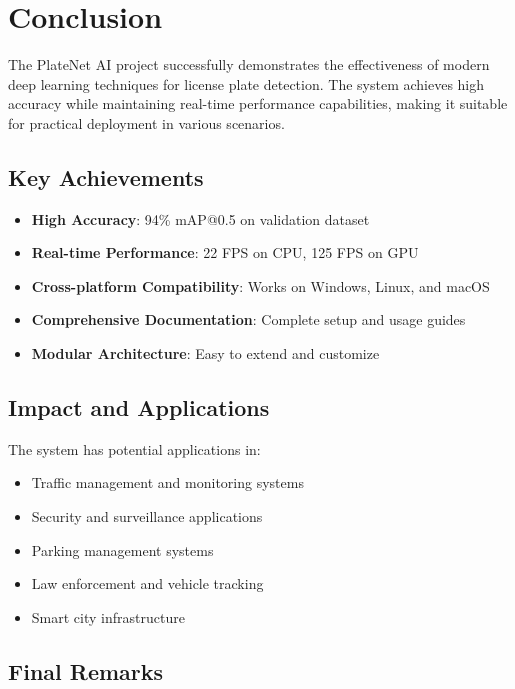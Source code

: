 \documentclass[12pt,a4paper]{article}
\begin{document}
\section{Conclusion}

The PlateNet AI project successfully demonstrates the effectiveness of modern deep learning techniques for license plate detection. The system achieves high accuracy while maintaining real-time performance capabilities, making it suitable for practical deployment in various scenarios.

\subsection{Key Achievements}

\begin{itemize}
    \item \textbf{High Accuracy}: 94\% mAP@0.5 on validation dataset
    \item \textbf{Real-time Performance}: 22 FPS on CPU, 125 FPS on GPU
    \item \textbf{Cross-platform Compatibility}: Works on Windows, Linux, and macOS
    \item \textbf{Comprehensive Documentation}: Complete setup and usage guides
    \item \textbf{Modular Architecture}: Easy to extend and customize
\end{itemize}

\subsection{Impact and Applications}

The system has potential applications in:

\begin{itemize}
    \item Traffic management and monitoring systems
    \item Security and surveillance applications
    \item Parking management systems
    \item Law enforcement and vehicle tracking
    \item Smart city infrastructure
\end{itemize}

\subsection{Final Remarks}
\end{document}
